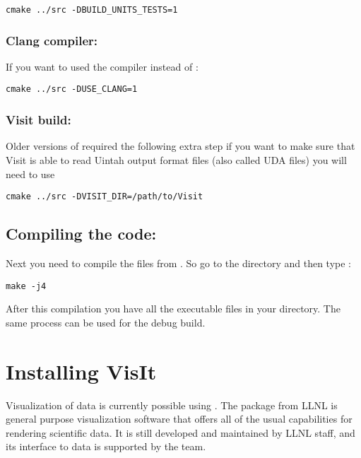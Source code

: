 \documentclass[11pt,fleqn]{book} %
\begin{document}
\begin{lstlisting}[backgroundcolor=\color{background}]
    cmake ../src -DBUILD_UNITS_TESTS=1
\end{lstlisting}

\subsection{ Clang compiler:}
If you want to used the  compiler instead of :

\begin{lstlisting}[backgroundcolor=\color{background}]
    cmake ../src -DUSE_CLANG=1
\end{lstlisting}

\subsection{ Visit build:}
Older versions of  required the following extra step if you want to make sure that Visit is able to read Uintah output format files (also called UDA files) you will need to use

\begin{lstlisting}[backgroundcolor=\color{background}]
   cmake ../src -DVISIT_DIR=/path/to/Visit
\end{lstlisting}

\section{Compiling the code:}
Next you need to compile the files from . So go to the  directory and then type : 
\begin{lstlisting}[backgroundcolor=\color{background}]
make -j4
\end{lstlisting}

After this compilation you have all the executable files in your  directory.
The same process can  be used for the debug build.

\chapter{Installing VisIt}
Visualization of \Vaango data is currently possible using
\Visit. The \Visit package from LLNL is general purpose
visualization software that offers all of the usual capabilities for
rendering scientific data.  It is still developed and maintained by
LLNL staff, and its interface to \Vaango data is supported by
the \Uintah team. 
\end{document}
